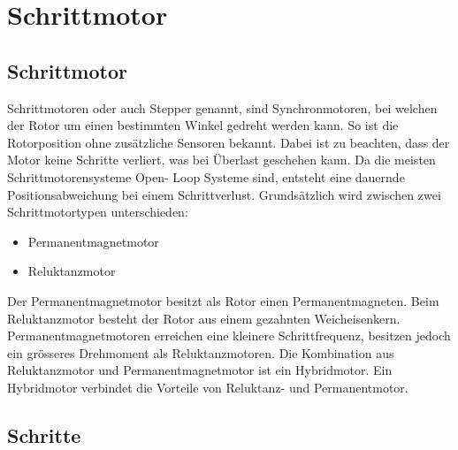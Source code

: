 \ifSTANDALONE
    \section{Schrittmotor} \label{sec:stepper}
\fi
\ifEMBED
    \subsection{Schrittmotor} \label{sec:stepper}
\fi
\ifEMBED
    \BLDCcollab
\fi
    Schrittmotoren oder auch Stepper genannt, sind Synchronmotoren, bei 
    welchen der Rotor um einen bestimmten Winkel gedreht werden kann. So ist 
    die Rotorposition ohne zusätzliche Sensoren bekannt. Dabei ist zu 
    beachten, dass der Motor keine Schritte verliert, was bei Überlast 
    geschehen kann. Da die meisten Schrittmotorensysteme Open- Loop Systeme 
    sind, entsteht eine dauernde Positionsabweichung bei einem Schrittverlust. 
    Grundsätzlich wird zwischen zwei Schrittmotortypen unterschieden: 
    \begin{itemize}
       	\item Permanentmagnetmotor
       	\item Reluktanzmotor
    \end{itemize} 
    Der Permanentmagnetmotor besitzt als Rotor einen Permanentmagneten. Beim 
    Reluktanzmotor besteht der Rotor aus einem gezahnten Weicheisenkern. 
    Permanentmagnetmotoren erreichen eine kleinere Schrittfrequenz, besitzen 
    jedoch ein grösseres Drehmoment als Reluktanzmotoren. Die Kombination 
    aus Reluktanzmotor und Permanentmagnetmotor ist ein Hybridmotor. Ein 
    Hybridmotor verbindet die Vorteile von Reluktanz- und Permanentmotor. 

\ifSTANDALONE
    \subsection{Schritte} \label{sec:steps}
\fi
\ifEMBED
